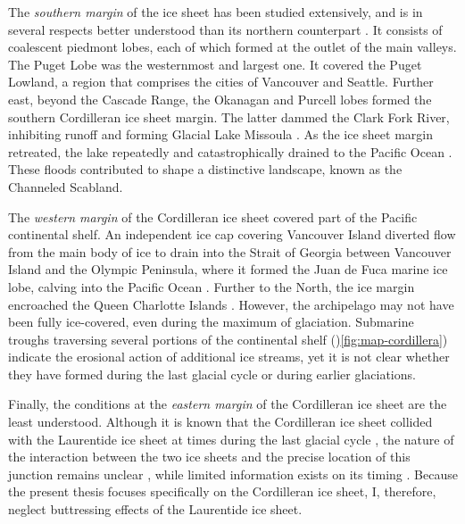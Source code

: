 \documentclass[a4paper]{kappa}
\begin{document}
The \emph{southern margin} of the ice sheet has been studied extensively, and
is in several respects better understood than its northern counterpart
\citep{Booth.etal.2003}. It consists of coalescent piedmont lobes, each of
which formed at the outlet of the main valleys. The Puget Lobe
\citep{Thorson.1980, Porter.Swanson.1998} was the westernmost and largest one.
It covered the Puget Lowland, a region that comprises the cities of Vancouver
and Seattle. Further east, beyond the Cascade Range, the Okanagan and Purcell
lobes formed the southern Cordilleran ice sheet margin. The latter dammed
the Clark Fork River, inhibiting runoff and forming Glacial Lake Missoula
\citep{Pardee.1910}. As the ice sheet margin retreated, the lake repeatedly and
catastrophically drained to the Pacific Ocean \citep{Bretz.1923,Waitt.1980}.
These floods contributed to shape a distinctive landscape, known as the
Channeled Scabland.

The \emph{western margin} of the Cordilleran ice sheet covered part of the
Pacific continental shelf. An independent ice cap covering Vancouver Island
diverted flow from the main body of ice to drain into the Strait of Georgia
between Vancouver Island and the Olympic Peninsula, where it formed the Juan
de Fuca marine ice lobe, calving into the Pacific Ocean \citep{Herzer.Bornhold.1982}. Further to the
North, the ice margin encroached the Queen Charlotte Islands \citep{Blaise.etal.1990}. However, the
archipelago may not have been fully ice-covered, even during the maximum of
glaciation. Submarine troughs traversing several portions of the continental
shelf ()\cref{fig:map-cordillera}) indicate the erosional action of additional ice streams, yet it is not
clear whether they have formed during the last glacial cycle or during earlier
glaciations.

Finally, the conditions at the \emph{eastern margin} of the Cordilleran ice
sheet are the least understood. Although it is known that the Cordilleran ice
sheet collided with the Laurentide ice sheet at times during the last glacial
cycle \citep[e.g.][]{Margold.etal.2013, Margold.etal.2013a}, the nature of the
interaction between the two ice sheets and the precise location of this
junction remains unclear \citep{Gowan.2013}, while limited information exists
on its timing \citep[e.g.][]{Jackson.etal.1997, Bednarski.Smith.2007}. Because
the present thesis focuses specifically on the Cordilleran ice sheet, I,
therefore, neglect buttressing effects of the Laurentide ice sheet.
\end{document}
